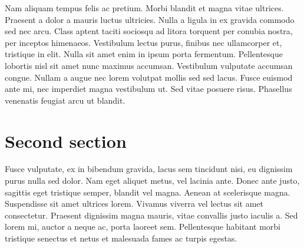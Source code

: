 Nam aliquam tempus felis ac pretium. Morbi blandit et magna vitae ultrices. Praesent a dolor a mauris luctus ultricies. Nulla a ligula in ex gravida commodo sed nec arcu. Class aptent taciti sociosqu ad litora torquent per conubia nostra, per inceptos himenaeos. Vestibulum lectus purus, finibus nec ullamcorper et, tristique in elit. Nulla sit amet enim in ipsum porta fermentum. Pellentesque lobortis nisl sit amet nunc maximus accumsan. Vestibulum vulputate accumsan congue. Nullam a augue nec lorem volutpat mollis sed sed lacus. Fusce euismod ante mi, nec imperdiet magna vestibulum ut. Sed vitae posuere risus. Phasellus venenatis feugiat arcu ut blandit.

\section{Second section}
Fusce vulputate, ex in bibendum gravida, lacus sem tincidunt nisi, eu dignissim purus nulla sed dolor. Nam eget aliquet metus, vel lacinia ante. Donec ante justo, sagittis eget tristique semper, blandit vel magna. Aenean at scelerisque magna. Suspendisse sit amet ultrices lorem. Vivamus viverra vel lectus sit amet consectetur. Praesent dignissim magna mauris, vitae convallis justo iaculis a. Sed lorem mi, auctor a neque ac, porta laoreet sem. Pellentesque habitant morbi tristique senectus et netus et malesuada fames ac turpis egestas.